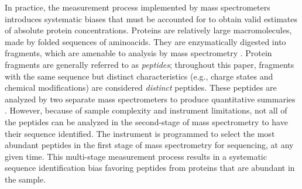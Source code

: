 In practice, the measurement process implemented by mass spectrometers introduces systematic biases that must be accounted for  to obtain valid estimates of absolute protein concentrations.
Proteins are relatively large macromolecules, made by folded sequences of aminoacids. 
They are enzymatically digested into fragments, which are amenable to analysis by mass spectrometry \citep{Thakur:2011kz}. 
Protein fragments are generally referred to as {\em peptides}; throughout this paper, fragments with the same sequence but distinct characteristics (e.g., charge states and chemical modifications) are considered {\em distinct} peptides. 
These peptides are analyzed by two separate mass spectrometers to produce quantitative summaries \citep{Steen:2004tk}. 
However, because of sample complexity and instrument limitations, not all of the peptides can be analyzed in the second-stage of mass spectrometry to have their sequence identified. 
The instrument is programmed to select the most abundant peptides in the first stage of mass spectrometry for sequencing, at any given time. This multi-stage measurement process results in a systematic sequence identification bias favoring peptides from proteins that are abundant in the sample.

